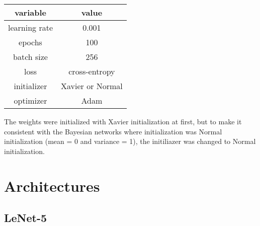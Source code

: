 \begin{table}[h!]
    \centering
    \renewcommand{\arraystretch}{2}
    \begin{tabular}[c]{c | c} 
     \hline
     variable & value \\ [0.5ex] 
     \hline
     learning rate &  0.001\\ 
     
     epochs & 100 \\
     
     batch size & 256 \\
     
     loss & cross-entropy \\
     
     initializer & Xavier \cite{glorot2010understanding} or Normal \\
     
     optimizer & Adam \cite{kingma2014adam} \\ [1ex] 
     \hline
    \end{tabular} 
    \renewcommand{\arraystretch}{2}
\end{table}

The weights were initialized with Xavier initialization \cite{glorot2010understanding} at first, but to make it consistent with the Bayesian networks where initialization was Normal initialization (mean = 0 and variance = 1), the initiliazer was changed to Normal initialization.

\section*{Architectures}

\subsection{LeNet-5}
 
